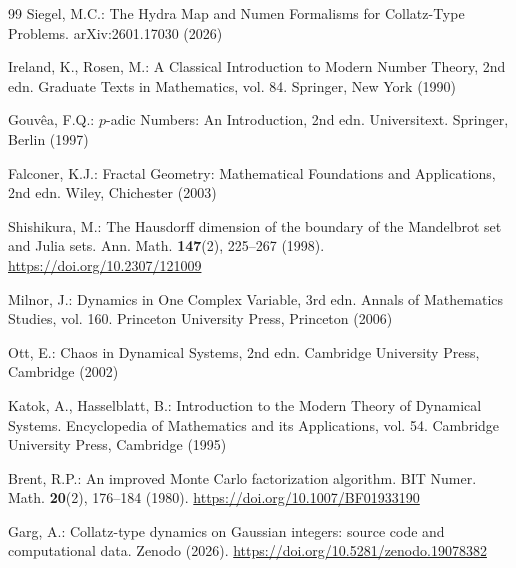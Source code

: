 \documentclass[12pt]{article}
\theoremstyle{plain}
\theoremstyle{definition}
\theoremstyle{remark}
\theoremstyle{definition}
\begin{document}
\begin{thebibliography}{99}
Siegel, M.C.: The Hydra Map and Numen Formalisms for Collatz-Type Problems.
arXiv:2601.17030 (2026)

Ireland, K., Rosen, M.: A Classical Introduction to Modern Number Theory,
2nd edn. Graduate Texts in Mathematics, vol. 84.
Springer, New York (1990)

Gouv\^{e}a, F.Q.: $p$-adic Numbers: An Introduction, 2nd edn.
Universitext. Springer, Berlin (1997)

Falconer, K.J.: Fractal Geometry: Mathematical Foundations and
Applications, 2nd edn. Wiley, Chichester (2003)

Shishikura, M.: The Hausdorff dimension of the boundary of the
Mandelbrot set and Julia sets.
Ann. Math. \textbf{147}(2), 225--267 (1998).
\url{https://doi.org/10.2307/121009}

Milnor, J.: Dynamics in One Complex Variable, 3rd edn.
Annals of Mathematics Studies, vol. 160.
Princeton University Press, Princeton (2006)

Ott, E.: Chaos in Dynamical Systems, 2nd edn.
Cambridge University Press, Cambridge (2002)

Katok, A., Hasselblatt, B.: Introduction to the Modern Theory of
Dynamical Systems. Encyclopedia of Mathematics and its Applications,
vol. 54. Cambridge University Press, Cambridge (1995)

Brent, R.P.: An improved Monte Carlo factorization algorithm.
BIT Numer. Math. \textbf{20}(2), 176--184 (1980).
\url{https://doi.org/10.1007/BF01933190}

Garg, A.: Collatz-type dynamics on Gaussian integers: source code
and computational data. Zenodo (2026).
\url{https://doi.org/10.5281/zenodo.19078382}

\end{thebibliography}
\end{document}

